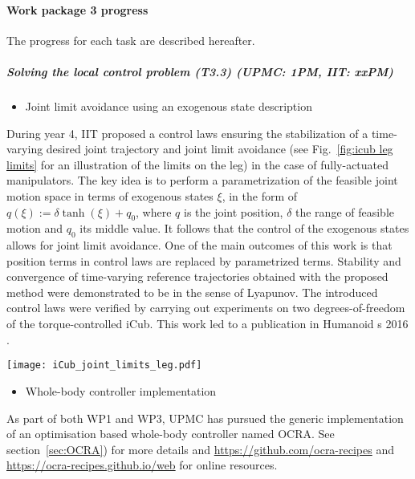 

 
\paragraph{Work package 3 progress}

The progress for each task are described hereafter.

\subparagraph{Solving the local control problem (T3.3) (UPMC: 1PM, IIT: xxPM)}

\begin{itemize}
\item {Joint limit avoidance using an exogenous state description}
\end{itemize}
During year 4, IIT proposed a control laws ensuring the stabilization of a time-varying desired joint trajectory and joint limit avoidance (see Fig.~\ref{fig:icub leg limits} for an illustration of the limits on the leg) in the case of fully-actuated manipulators. The key idea is to perform a parametrization of the feasible joint motion space in terms of exogenous states $\xi$, in the form of $q(\xi) := \delta \tanh(\xi) + q_0$, where $q$ is the joint position, $\delta$ the range of feasible motion and $q_0$ its middle value. It follows that the control of the exogenous states allows for joint limit avoidance. One of the main outcomes of this work is that position terms in control laws are replaced by parametrized terms. Stability and convergence of time-varying reference trajectories obtained with the proposed method were demonstrated to be in the sense of Lyapunov. The introduced control laws were verified by carrying out experiments on two degrees-of-freedom of the torque-controlled iCub. This work led to a publication in Humanoid s 2016 \cite{charbonneau2016Humanoids}.

\begin{figure*}
   \begin{center}
    \texttt{[image: iCub\_joint\_limits\_leg.pdf]}
    \caption{iCub leg setup used for the experiments. The red circles identify the hip and knee joints, while the white marks indicate joint limits. The green arrow shows the external force applied during experiments.}
    \label{fig:icub leg limits}
    \end{center}
\end{figure*}


\begin{itemize}
\item {Whole-body controller implementation}
\end{itemize}
As part of both WP1 and WP3, UPMC has pursued the generic implementation of an optimisation based whole-body controller named OCRA. See section~\ref{sec:OCRA}) for more details and \url{https://github.com/ocra-recipes} and \url{https://ocra-recipes.github.io/web} for online resources.

